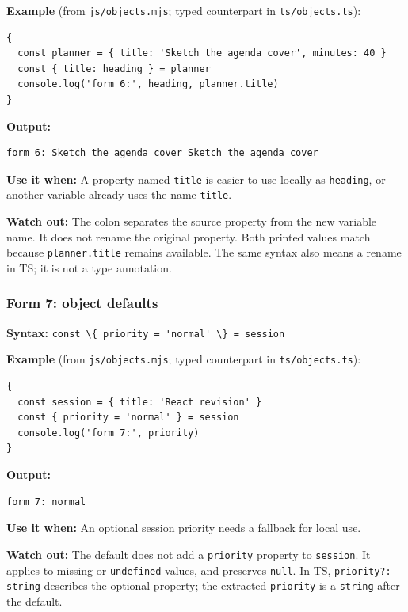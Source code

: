 \documentclass[
  11pt,
]{article}
\newcommand{\passthrough}[1]{#1}
\begin{document}
\textbf{Example} (from \passthrough{\lstinline!js/objects.mjs!}; typed
counterpart in \passthrough{\lstinline!ts/objects.ts!}):

\begin{lstlisting}
{
  const planner = { title: 'Sketch the agenda cover', minutes: 40 }
  const { title: heading } = planner
  console.log('form 6:', heading, planner.title)
}
\end{lstlisting}

\textbf{Output:}

\begin{lstlisting}
form 6: Sketch the agenda cover Sketch the agenda cover
\end{lstlisting}

\textbf{Use it when:} A property named \passthrough{\lstinline!title!}
is easier to use locally as \passthrough{\lstinline!heading!}, or
another variable already uses the name \passthrough{\lstinline!title!}.

\textbf{Watch out:} The colon separates the source property from the new
variable name. It does not rename the original property. Both printed
values match because \passthrough{\lstinline!planner.title!} remains
available. The same syntax also means a rename in TS; it is not a type
annotation.

\subsubsection{Form 7: object defaults}\label{form-7-object-defaults}

\textbf{Syntax:}
\passthrough{\lstinline!const \{ priority = 'normal' \} = session!}

\textbf{Example} (from \passthrough{\lstinline!js/objects.mjs!}; typed
counterpart in \passthrough{\lstinline!ts/objects.ts!}):

\begin{lstlisting}
{
  const session = { title: 'React revision' }
  const { priority = 'normal' } = session
  console.log('form 7:', priority)
}
\end{lstlisting}

\textbf{Output:}

\begin{lstlisting}
form 7: normal
\end{lstlisting}

\textbf{Use it when:} An optional session priority needs a fallback for
local use.

\textbf{Watch out:} The default does not add a
\passthrough{\lstinline!priority!} property to
\passthrough{\lstinline!session!}. It applies to missing or
\passthrough{\lstinline!undefined!} values, and preserves
\passthrough{\lstinline!null!}. In TS,
\passthrough{\lstinline!priority?: string!} describes the optional
property; the extracted \passthrough{\lstinline!priority!} is a
\passthrough{\lstinline!string!} after the default.
\end{document}

